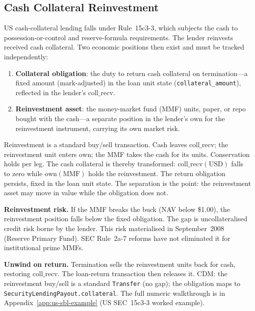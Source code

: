 \subsection{Cash Collateral Reinvestment}
\label{sec:sbl-reinvestment}

US cash-collateral lending falls under Rule~15c3-3, which subjects the cash to possession-or-control and reserve-formula requirements. The lender reinvests received cash collateral. Two economic positions then exist and must be tracked independently:

\begin{enumerate}[nosep]
\item \textbf{Collateral obligation}: the duty to return cash collateral on termination---a fixed amount (mark-adjusted) in the loan unit state (\texttt{collateral\_amount}), reflected in the lender's $\mathrm{coll\_recv}$.
\item \textbf{Reinvestment asset}: the money-market fund (MMF) units, paper, or repo bought with the cash---a separate position in the lender's $\mathrm{own}$ for the reinvestment instrument, carrying its own market risk.
\end{enumerate}

Reinvestment is a standard buy/sell transaction. Cash leaves $\mathrm{coll\_recv}$; the reinvestment unit enters $\mathrm{own}$; the MMF takes the cash for its units. Conservation holds per leg. The cash collateral is thereby transformed: $\mathrm{coll\_recv}(\text{USD})$ falls to zero while $\mathrm{own}(\text{MMF})$ holds the reinvestment. The return obligation persists, fixed in the loan unit state. The separation is the point: the reinvestment asset may move in value while the obligation does not.

\noindent\textbf{Reinvestment risk.} If the MMF breaks the buck (NAV below \$1.00), the reinvestment position falls below the fixed obligation. The gap is uncollateralised credit risk borne by the lender. This risk materialised in September~2008 (Reserve Primary Fund). SEC Rule~2a-7 reforms have not eliminated it for institutional prime MMFs.

\noindent\textbf{Unwind on return.} Termination sells the reinvestment units back for cash, restoring $\mathrm{coll\_recv}$. The loan-return transaction then releases it. CDM: the reinvestment buy/sell is a standard \texttt{Transfer} (no gap); the obligation maps to \texttt{SecurityLendingPayout.collateral}. The full numeric walkthrough is in Appendix~\ref{app:us-sbl-example} (US SEC~15c3-3 worked example).


